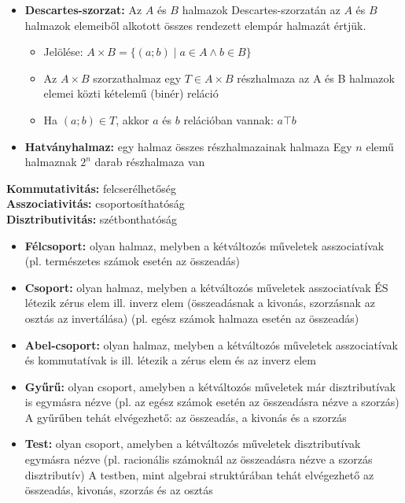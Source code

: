 \documentclass[12pt,a4paper]{article}
\begin{document}
\begin{tcolorbox}[colback=green!5!white,colframe=green!60!black,title= 2. Descartes-szorzat{,} hatványhalmaz]
    \begin{itemize}
        \item \textbf{Descartes-szorzat:} Az \(A\) és \(B\) halmazok Descartes-szorzatán az \(A\) és \(B\) halmazok elemeiből alkotott összes rendezett elempár halmazát értjük.
        \begin{itemize}
            \item Jelölése: \(A \times B = \{ (a;b) \mid  a \in A \wedge  b \in B \}\)
            \item Az \(A \times  B\) szorzathalmaz egy \(T \in A \times B\) részhalmaza az A és B halmazok elemei közti kételemű (binér) reláció
            \item Ha \((a; b) \in T\), akkor \(a\) és \(b\) relációban vannak: \(a\top b \)
        \end{itemize}
        \item \textbf{Hatványhalmaz:} egy halmaz összes részhalmazainak halmaza  
        Egy \(n\) elemű halmaznak \(2^n\) darab részhalmaza van
    \end{itemize}
    \textbf{Kommutativitás:} felcserélhetőség\\
    \textbf{Asszociativitás:} csoportosíthatóság\\
    \textbf{Disztributivitás:} szétbonthatóság
\end{tcolorbox}

\begin{tcolorbox}[colback=green!5!white,colframe=green!60!black,title= 3. Csoport{,} gyűrű{,} test]
    \begin{itemize}
        \item \textbf{Félcsoport:} olyan halmaz, melyben a kétváltozós műveletek asszociatívak (pl. természetes számok esetén az összeadás)
        \item \textbf{Csoport:} olyan halmaz, melyben a kétváltozós műveletek asszociatívak ÉS létezik
        zérus elem ill. inverz elem (összeadásnak a kivonás, szorzásnak az osztás az
        invertálása) (pl. egész számok halmaza esetén az összeadás)
        \item \textbf{Abel-csoport:} olyan halmaz, melyben a kétváltozós műveletek asszociatívak és
        kommutatívak is ill. létezik a zérus elem és az inverz elem
        \item \textbf{Gyűrű:} olyan csoport, amelyben a kétváltozós műveletek már disztributívak is
        egymásra nézve (pl. az egész számok esetén az összeadásra nézve a szorzás)
        A gyűrűben tehát elvégezhető: az összeadás, a kivonás és a szorzás
        \item \textbf{Test:} olyan csoport, amelyben a kétváltozós műveletek disztributívak egymásra nézve
        (pl. racionális számoknál az összeadásra nézve a szorzás disztributív)
        A testben, mint algebrai struktúrában tehát elvégezhető az összeadás, kivonás,
        szorzás és az osztás
    \end{itemize}
\end{tcolorbox}
\end{document}
